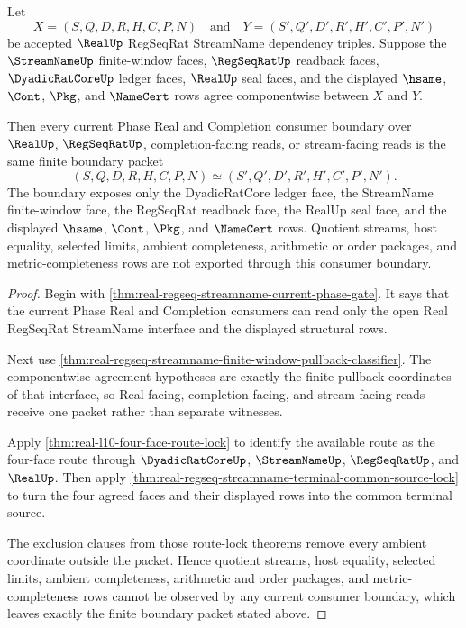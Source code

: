 \begin{theorem}
\label{thm:real-regseq-streamname-four-face-consumer-boundary}
Let
$$
X=(S,Q,D,R,H,C,P,N)
\quad\text{and}\quad
Y=(S',Q',D',R',H',C',P',N')
$$
be accepted $\RealUp$ RegSeqRat StreamName dependency triples. Suppose the
$\StreamNameUp$ finite-window faces, $\RegSeqRatUp$ readback faces,
$\DyadicRatCoreUp$ ledger faces, $\RealUp$ seal faces, and the displayed
$\hsame$, $\Cont$, $\Pkg$, and $\NameCert$ rows agree componentwise between
$X$ and $Y$.

Then every current Phase Real and Completion consumer boundary over
$\RealUp$, $\RegSeqRatUp$, completion-facing reads, or stream-facing reads is
the same finite boundary packet
$$
(S,Q,D,R,H,C,P,N)\simeq(S',Q',D',R',H',C',P',N').
$$
The boundary exposes only the DyadicRatCore ledger face, the StreamName
finite-window face, the RegSeqRat readback face, the RealUp seal face, and the
displayed $\hsame$, $\Cont$, $\Pkg$, and $\NameCert$ rows. Quotient streams,
host equality, selected limits, ambient completeness, arithmetic or order
packages, and metric-completeness rows are not exported through this consumer
boundary.
\end{theorem}
\begin{proof}
Begin with \autoref{thm:real-regseq-streamname-current-phase-gate}. It says
that the current Phase Real and Completion consumers can read only the open
Real RegSeqRat StreamName interface and the displayed structural rows.

Next use
\autoref{thm:real-regseq-streamname-finite-window-pullback-classifier}. The
componentwise agreement hypotheses are exactly the finite pullback
coordinates of that interface, so Real-facing, completion-facing, and
stream-facing reads receive one packet rather than separate witnesses.

Apply \autoref{thm:real-l10-four-face-route-lock} to identify the available
route as the four-face route through $\DyadicRatCoreUp$, $\StreamNameUp$,
$\RegSeqRatUp$, and $\RealUp$. Then apply
\autoref{thm:real-regseq-streamname-terminal-common-source-lock} to turn the
four agreed faces and their displayed rows into the common terminal source.

The exclusion clauses from those route-lock theorems remove every ambient
coordinate outside the packet. Hence quotient streams, host equality,
selected limits, ambient completeness, arithmetic and order packages, and
metric-completeness rows cannot be observed by any current consumer boundary,
which leaves exactly the finite boundary packet stated above.
\end{proof}

